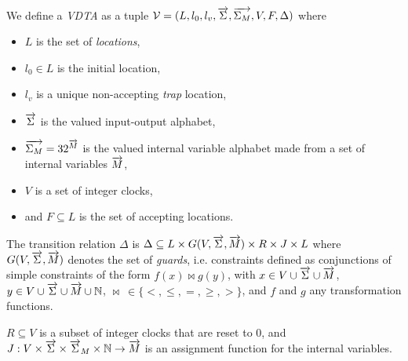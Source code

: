 \begin{definition}
	\label{def:vdta}We define a \emph{\acf{VDTA}} as a tuple $\mathcal{V} = (L, l_0, l_v, \overrightarrow{\Sigma}, \overrightarrow{\Sigma_M}, V, F, \Delta)$ where
	\begin{itemize}
		\item $L$ is the set of \emph{locations},
		\item $l_0 \in L$ is the initial location,
		\item $l_v$ is a unique non-accepting \emph{trap} location,
		\item $\overrightarrow{\Sigma}$ is the valued input-output alphabet,
		\item $\overrightarrow{\Sigma_M} = 32^{\overrightarrow{M}}$ is the valued internal variable alphabet made from a set of internal variables $\overrightarrow{M}$,
		\item $V$ is a set of integer clocks,
		\item and $F \subseteq L$ is the set of accepting locations.
	\end{itemize}
	
	The transition relation $\Delta$ is $\Delta \subseteq L \times G(V,\overrightarrow{\Sigma},\overrightarrow{M}) \times R \times J \times L$ where ${G}(V,\overrightarrow{\Sigma},\overrightarrow{M})$ denotes the set of {\em guards}, i.e. constraints defined as conjunctions of simple constraints of the form $f(x) \bowtie g(y)$, with $x \in V \cup \overrightarrow{\Sigma} \cup \overrightarrow{M}$, $y \in V \cup \overrightarrow{\Sigma} \cup \overrightarrow{M} \cup \mathbb{N}$, $\bowtie~\in \{<,\leq,=,\geq,>\}$, and $f$ and $g$ any transformation functions. 
	
	$R\subseteq V$ is a subset of integer clocks that are reset to 0,
	and $J : V \times \overrightarrow{\Sigma} \times \overrightarrow{\Sigma}_{M} \times \mathbb{N} \rightarrow \overrightarrow{M}$ is an assignment function for the internal variables.
\end{definition}

